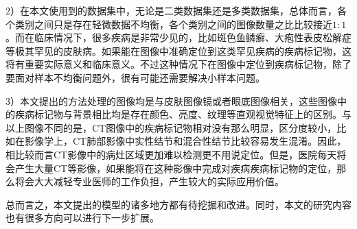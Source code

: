 2）在本文使用到的数据集中，无论是二类数据集还是多类数据集，总体而言，各个类别之间只是存在轻微数据不均衡，各个类别之间的图像数量之比比较接近$1:1$。而在临床情况下，很多疾病是非常少见的，比如斑色鱼鳞癣、大疱性表皮松解症等极其罕见的皮肤病。如果能在图像中准确定位到这类罕见疾病的疾病标记物，这将有重要实际意义和临床意义。不过这种情况下在图像中定位到疾病标记物，除了要面对样本不均衡问题外，很有可能还需要解决小样本问题。

3）本文提出的方法处理的图像均是与皮肤图像镜或者眼底图像相关，这些图像中的疾病标记物与背景相比均是存在颜色、亮度、纹理等直观视觉特征上的区别。与以上图像不同的是，CT图像中的疾病标记物相对没有那么明显，区分度较小，比如在影像学上，CT肺部影像中实性结节和混合性结节比较容易发生混淆。因此，相比较而言CT影像中的病灶区域更加难以检测更不用说定位。但是，医院每天将会产生大量CT等影像，如果能将在这种影像中完成对疾病疾病标记物的定位，那么将会大大减轻专业医师的工作负担，产生较大的实际应用价值。

总而言之，本文提出的模型的诸多地方都有待挖掘和改进。同时，本文的研究内容也有很多方向可以进行下一步扩展。
